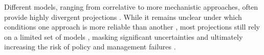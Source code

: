 \documentclass[11pt,letter]{article}
\begin{document}

Different models, ranging from correlative to more mechanistic approaches, often provide highly divergent projections \citep{Morin2009, Keenan2011a, Cheaib2012, Takolander2019}. While it remains unclear under which conditions one approach is more reliable than another \citep{VanderMeersch2024}, most projections still rely on a limited set of models \citep{Dyderski2018, Wessely2024, Hanewinkel2013, Schueler2014}, masking significant uncertainties and ultimately increasing the risk of policy and management failures \citep{Dawson2011}. 


\end{document}
